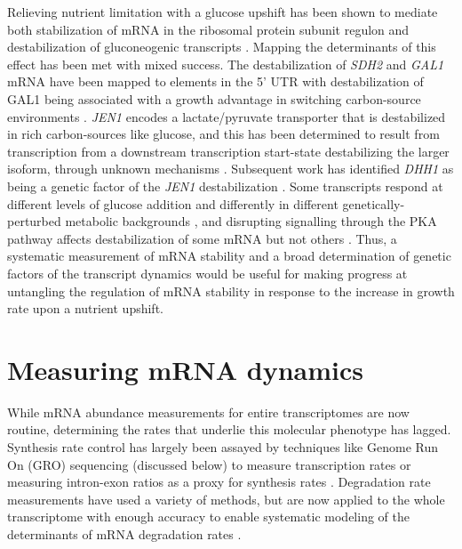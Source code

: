 Relieving nutrient limitation with a glucose upshift has
been shown to mediate both stabilization of mRNA in the ribosomal
protein subunit regulon 
\parencite{yin2003glucose}
and destabilization of
gluconeogenic transcripts 
\parencite{de2002role,mercado1994levels,scheffler1998control,lombardo1992control}. 
Mapping the
determinants of this effect has been met with mixed success. The
destabilization of \textit{SDH2} and \textit{GAL1} mRNA have been 
mapped to elements in the 5' UTR 
\parencite{scheffler1998control,bennett2008metabolic}
with destabilization of GAL1 being
associated with a growth advantage in switching carbon-source
environments \parencite{baumgartner2011antagonistic}. 
\textit{JEN1} encodes a lactate/pyruvate transporter that is
destabilized in rich carbon-sources like glucose, and this has been
determined to result from transcription from a downstream
transcription start-state destabilizing the larger isoform, through
unknown mechanisms \parencite{andrade2005multiple}.
Subsequent work has identified \textit{DHH1} as being a genetic 
factor of the \textit{JEN1} destabilization \parencite{mota2014role}. 
Some transcripts respond at different levels of glucose
addition and differently in different genetically-perturbed metabolic
backgrounds 
\parencite{yin2000differential}, and disrupting signalling through the
PKA pathway affects destabilization of some mRNA but not others 
\parencite{yin2003glucose}. 
Thus, a systematic measurement of mRNA stability and a
broad determination of genetic factors of the transcript dynamics
would be useful for making progress at untangling the regulation of
mRNA stability in response to the increase in growth rate upon a
nutrient upshift.  

\section{Measuring mRNA dynamics}

While mRNA
abundance measurements for entire transcriptomes are now routine,
determining the rates that underlie this molecular phenotype has
lagged. Synthesis rate control has largely been assayed by techniques
like Genome Run On (GRO) sequencing (discussed below) to measure
transcription rates or measuring intron-exon ratios 
\parencite{gray2014snapshot} as a proxy for synthesis rates 
\parencite{perez2013eukaryotic}.
Degradation rate measurements have used a variety of methods, but are
now applied to the whole transcriptome with enough accuracy to enable
systematic modeling of the determinants of mRNA degradation rates
\parencite{perez2013eukaryotic,neymotin2016multiple,cheng2017cis}.

